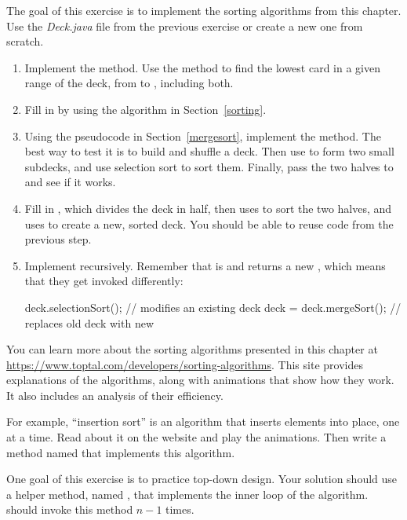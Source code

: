 \begin{exercise}  %

The goal of this exercise is to implement the sorting algorithms from this chapter.
Use the {\it Deck.java} file from the previous exercise or create a new one from scratch.

\begin{enumerate}

\item Implement the  method.
Use the  method to find the lowest card in a given range of the deck, from  to , including both.

\item Fill in  by using the algorithm in Section~\ref{sorting}.

\item Using the pseudocode in Section~\ref{mergesort}, implement the  method.
The best way to test it is to build and shuffle a deck.
Then use  to form two small subdecks, and use selection sort to sort them.
Finally, pass the two halves to  and see if it works.

\item Fill in , which divides the deck in half, then uses  to sort the two halves, and uses  to create a new, sorted deck.
You should be able to reuse code from the previous step.

\item Implement  recursively.
Remember that  is  and  returns a new , which means that they get invoked differently:

\begin{code}
deck.selectionSort();      // modifies an existing deck
deck = deck.mergeSort();   // replaces old deck with new
\end{code}

\end{enumerate}

\end{exercise}


\begin{exercise}

You can learn more about the sorting algorithms presented in this chapter at \url{https://www.toptal.com/developers/sorting-algorithms}.
This site provides explanations of the algorithms, along with animations that show how they work.
It also includes an analysis of their efficiency.

For example, ``insertion sort'' is an algorithm that inserts elements into place, one at a time.
Read about it on the website and play the animations.
Then write a method named  that implements this algorithm.

One goal of this exercise is to practice top-down design.
Your solution should use a helper method, named , that implements the inner loop of the algorithm.
 should invoke this method $n-1$ times.


\end{exercise}


